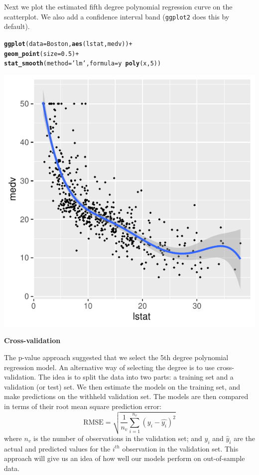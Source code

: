 \documentclass[11pt]{article}\usepackage[]{graphicx}\usepackage[]{color}
\makeatletter
\def\maxwidth{ %
  \ifdim\Gin@nat@width>\linewidth
    \linewidth
  \else
    \Gin@nat@width
  \fi
}
\newcommand{\hlnum}[1]{\textcolor[rgb]{0.686,0.059,0.569}{#1}}%
\newcommand{\hlstr}[1]{\textcolor[rgb]{0.192,0.494,0.8}{#1}}%
\newcommand{\hlopt}[1]{\textcolor[rgb]{0,0,0}{#1}}%
\newcommand{\hlstd}[1]{\textcolor[rgb]{0.345,0.345,0.345}{#1}}%
\newcommand{\hlkwc}[1]{\textcolor[rgb]{0.333,0.667,0.333}{#1}}%
\newcommand{\hlkwd}[1]{\textcolor[rgb]{0.737,0.353,0.396}{\textbf{#1}}}%
\newenvironment{kframe}{%
 \def\at@end@of@kframe{}%
 \ifinner\ifhmode%
  \def\at@end@of@kframe{\end{minipage}}%
  \begin{minipage}{\columnwidth}%
 \fi\fi%
 \def\FrameCommand##1{\hskip\@totalleftmargin \hskip-\fboxsep
 \colorbox{shadecolor}{##1}\hskip-\fboxsep
     \hskip-\linewidth \hskip-\@totalleftmargin \hskip\columnwidth}%
 \MakeFramed {\advance\hsize-\width
   \@totalleftmargin\z@ \linewidth\hsize
   \@setminipage}}%
 {\par\unskip\endMakeFramed%
 \at@end@of@kframe}
\newenvironment{knitrout}{}{} %
\makeatother
\begin{document}
Next we plot the estimated fifth degree polynomial regression curve on the scatterplot.  We also add a confidence interval band (\texttt{ggplot2} does this by default).  
\begin{knitrout}
\color{fgcolor}\begin{kframe}
\begin{alltt}
\hlkwd{ggplot}\hlstd{(}\hlkwc{data}\hlstd{=Boston,} \hlkwd{aes}\hlstd{(lstat, medv))} \hlopt{+}
  \hlkwd{geom_point}\hlstd{(}\hlkwc{size}\hlstd{=}\hlnum{0.5}\hlstd{)} \hlopt{+}
  \hlkwd{stat_smooth}\hlstd{(}\hlkwc{method} \hlstd{=} \hlstr{'lm'}\hlstd{,} \hlkwc{formula} \hlstd{= y} \hlopt{~} \hlkwd{poly}\hlstd{(x,} \hlnum{5}\hlstd{))}
\end{alltt}
\end{kframe}
\includegraphics[width=\maxwidth]{figure/unnamed-chunk-6-1} 

\end{knitrout}

\vspace{20pt}
\Large
\textbf{Cross-validation}\\
\normalsize

The p-value approach suggested that we select the 5th degree polynomial regression model.  An alternative way of selecting the degree is to use cross-validation.  The idea is to split the data into two parts: a training set and a validation (or test) set.  We then estimate the models on the training set, and make predictions on the withheld validation set.  The models are then compared in terms of their root mean square prediction error:
$$ \text{RMSE} = \sqrt{\frac{1}{n_v} \sum_{i=1}^{n_v} (y_i - \hat{y_i})^2} $$
where $n_v$ is the number of observations in the validation set; and $y_i$ and $\hat{y}_i$ are the actual and predicted values for the $i^{th}$ observation in the validation set.  This approach will give us an idea of how well our models perform on out-of-sample data.
\clearpage
\end{document}
